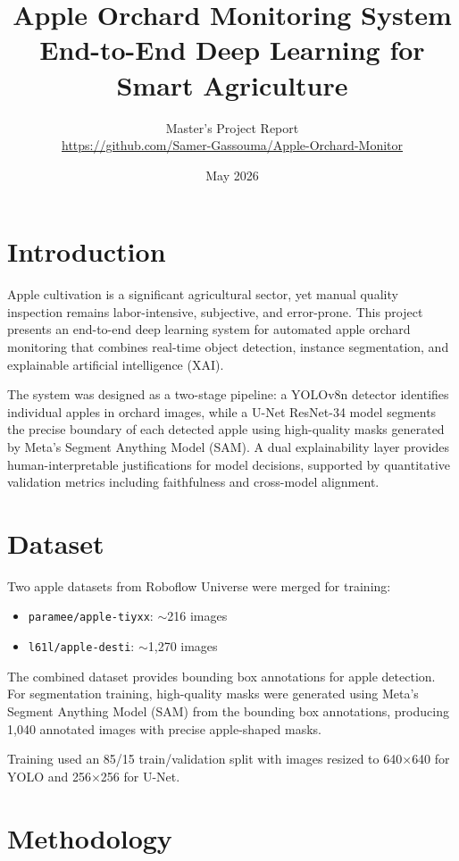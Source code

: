 \documentclass[12pt,a4paper]{article}
\title{\textbf{Apple Orchard Monitoring System}\\
\large End-to-End Deep Learning for Smart Agriculture}
\author{Master's Project Report\\
\small \url{https://github.com/Samer-Gassouma/Apple-Orchard-Monitor}}
\date{May 2026}
\begin{document}
\maketitle

\section{Introduction}

Apple cultivation is a significant agricultural sector, yet manual quality inspection remains labor-intensive, subjective, and error-prone. This project presents an end-to-end deep learning system for automated apple orchard monitoring that combines real-time object detection, instance segmentation, and explainable artificial intelligence (XAI).

The system was designed as a two-stage pipeline: a YOLOv8n detector identifies individual apples in orchard images, while a U-Net ResNet-34 model segments the precise boundary of each detected apple using high-quality masks generated by Meta's Segment Anything Model (SAM). A dual explainability layer provides human-interpretable justifications for model decisions, supported by quantitative validation metrics including faithfulness and cross-model alignment.

\section{Dataset}

Two apple datasets from Roboflow Universe were merged for training:
\begin{itemize}
  \item \texttt{paramee/apple-tiyxx}: $\sim$216 images
  \item \texttt{l61l/apple-desti}: $\sim$1,270 images
\end{itemize}

The combined dataset provides bounding box annotations for apple detection. For segmentation training, high-quality masks were generated using Meta's Segment Anything Model (SAM) from the bounding box annotations, producing 1,040 annotated images with precise apple-shaped masks.

Training used an 85/15 train/validation split with images resized to 640$\times$640 for YOLO and 256$\times$256 for U-Net.

\section{Methodology}
\end{document}
